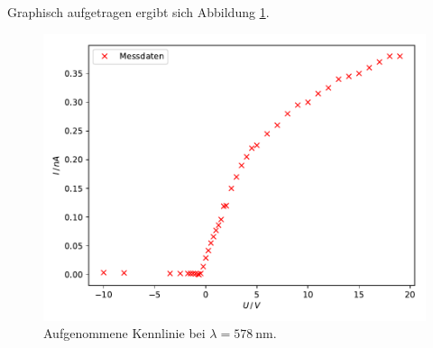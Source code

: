 Graphisch aufgetragen ergibt sich Abbildung \ref{fig:plot3}. 

\begin{figure}
  \centering
  \includegraphics{content/plot6.pdf}
  \caption{Aufgenommene Kennlinie bei $\lambda=\SI{578}{\nano\meter}$.}
  \label{fig:plot3}
\end{figure}

